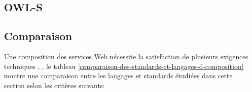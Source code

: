     \newpage
    \subsection{OWL-S}
    \label{sec:owl-s}
    \cite{mcilraith2003bringing}
    \newpage
    \subsection{Comparaison}
    \label{sec:langs-comparaison}   
    Une composition des services Web nécessite la satisfaction de
    plusieurs exigences techniques \cite{sheng2014web},
    \cite{bucchiarone2006survey}, le tableau
    \ref{comparaison-des-standards-et-langages-d-composition} montre
    une comparaison entre les langages et standards étudiées dans
    cette section selon les critères suivants:
    

